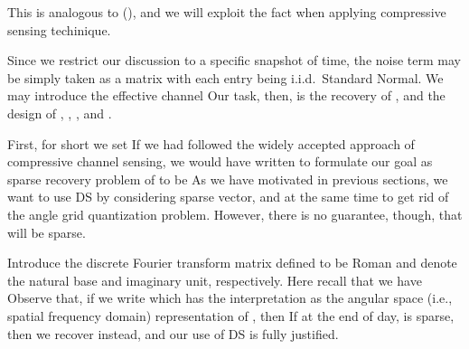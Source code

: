 This is analogous to (), and we will exploit the fact when applying compressive sensing techinique.

Since we restrict our discussion to a specific snapshot of time, the noise term may be simply taken as a matrix  with each entry being i.i.d.\ Standard Normal.
We may introduce the effective channel
Our task, then, is the recovery of , and the design of , , , and .

\stopsection
\startsubsection [title={Vectorization}]

First, for short we set
If we had followed the widely accepted approach of compressive channel sensing, we would have written
to formulate our goal as sparse recovery problem of  to be
As we have motivated in previous sections, we want to use DS by considering sparse vector, and at the same time to get rid of the angle grid quantization problem.
However, there is no guarantee, though, that  will be sparse.

\stopsection
\startsection [title={Working in the Angular Space}]

Introduce the discrete Fourier transform matrix  defined to be
Roman  and  denote the natural base and imaginary unit, respectively.
Here recall that we have
Observe that, if we write
which has the interpretation as the angular space (i.e., spatial frequency domain) representation of , then
If at the end of day,  is sparse, then we recover  instead, and our use of DS is fully justified.

